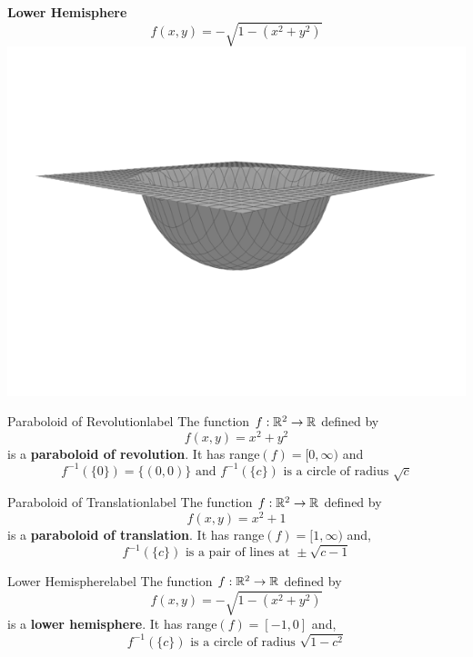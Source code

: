 \begin{marginfigure}
\begin{center}
        \LineBreak
        \textbf{Lower Hemisphere}
        \[f(x, y) = - \sqrt{1 - (x^2 + y^2)}\]
        \includegraphics[width=\linewidth]{figures/wk-1/fig-9.png}
    \end{center}
\end{marginfigure}

\begin{ex}{Paraboloid of Revolution}{label}
    The function $f: \mathbb{R}^2 \rightarrow \mathbb{R}$ defined by
    \[f(x, y) = x^2 + y^2\]
    is a \textbf{paraboloid of revolution}. It has range$(f) = [0, \infty)$ and
    \[f^{-1}(\{0\}) = \{(0, 0)\} \text{ and } f^{-1}(\{c\}) \text{ is a circle of radius } \sqrt{c}\]
\end{ex}

\begin{ex}{Paraboloid of Translation}{label}
    The function $f: \mathbb{R}^2 \rightarrow \mathbb{R}$ defined by
    \[f(x, y) = x^2 + 1\]
    is a \textbf{paraboloid of translation}. It has range$(f) = [1, \infty)$ and,
    \[f^{-1}(\{c\}) \text{ is a pair of lines at } \pm \sqrt{c-1}\]
\end{ex}

\begin{ex}{Lower Hemisphere}{label}
    The function $f: \mathbb{R}^2 \rightarrow \mathbb{R}$ defined by
\[f(x, y) = - \sqrt{1 - (x^2 + y^2)}\]
    is a \textbf{lower hemisphere}. It has range$(f) = [-1, 0]$ and,
    \[f^{-1}(\{c\}) \text{ is a circle of radius } \sqrt{1-c^2}\]
\end{ex}

